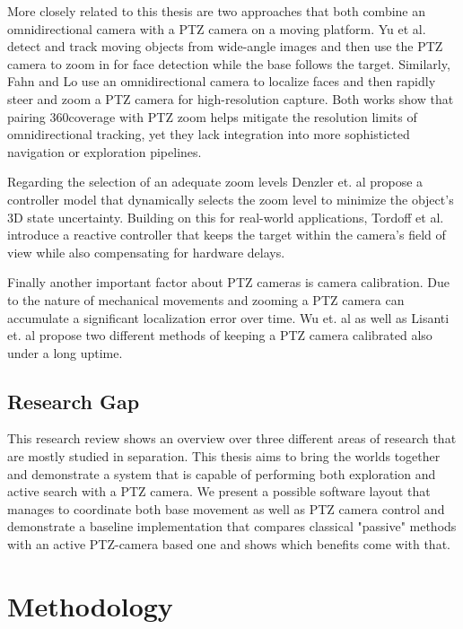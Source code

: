 \documentclass[
	parspace, %
	noindent, %
	final, %
]{elteikthesis}
\begin{document}
More closely related to this thesis are two approaches that both combine an omnidirectional camera with a PTZ camera on a moving platform. Yu et al. \cite{visual_yu_2010} detect and track moving objects from wide-angle images and then use the PTZ camera to zoom in for face detection while the base follows the target. Similarly, Fahn and Lo \cite{highdefinition_fahn_2010} use an omnidirectional camera to localize faces and then rapidly steer and zoom a PTZ camera for high-resolution capture. Both works show that pairing 360\textdegree coverage with PTZ zoom helps mitigate the resolution limits of omnidirectional tracking, yet they lack integration into more sophisticted navigation or exploration pipelines.

Regarding the selection of an adequate zoom levels Denzler et. al \cite{information_denzler_2003} propose a controller model  that dynamically selects the zoom level to minimize the object's 3D state uncertainty. Building on this for real-world applications, Tordoff et al. \cite{reactive_tordoff_2007} introduce a reactive controller that keeps the target within the camera's field of view while also compensating for hardware delays.

Finally another important factor about PTZ cameras is camera calibration. Due to the nature of mechanical movements and zooming a PTZ camera can accumulate a significant localization error over time. Wu et. al \cite{keeping_wu_2013} as well as Lisanti et. al \cite{continuous_lisanti_2016} propose two different methods of keeping a PTZ camera calibrated also under a long uptime.

\section{Research Gap}
This research review shows an overview over three different areas of research that are mostly studied in separation. This thesis aims to bring the worlds together and demonstrate a system that is capable of performing both exploration and active search with a PTZ camera. We present a possible software layout that manages to coordinate both base movement as well as PTZ camera control and demonstrate a baseline implementation that compares classical "passive" methods with an active PTZ-camera based one and shows which benefits come with that.

\chapter{Methodology}
\label{ch:methodology}
\end{document}

